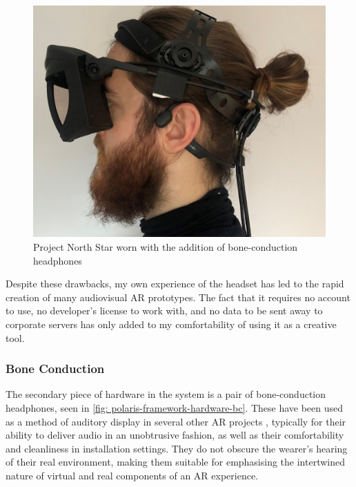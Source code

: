 \begin{figure}
    \vspace{-\intextsep}
    \hfill
    \begin{minipage}{0.95\linewidth}
            \includegraphics[width=\linewidth]{figures/06-polaris/polaris-framework-hardware-bc.jpg}
            \captionsetup{justification=justified}
            \caption{Project North Star worn with the addition of bone-conduction headphones}\label{fig: polaris-framework-hardware-bc}
    \end{minipage}
\end{figure}
Despite these drawbacks, my own experience of the headset has led to the rapid creation of many audiovisual AR prototypes. The fact that it requires no account to use, no developer's license to work with, and no data to be sent away to corporate servers has only added to my comfortability of using it as a creative tool.

\subsubsection{Bone Conduction}\label{sec: polaris-framework-hardware-bc}
The secondary piece of hardware in the system is a pair of bone-conduction headphones, seen in \autoref{fig: polaris-framework-hardware-bc}. These have been used as a method of auditory display in several other AR projects \citep{lindeman2008,barde2016,chevalier2018}, typically for their ability to deliver audio in an unobtrusive fashion, as well as their comfortability and cleanliness in installation settings. They do not obscure the wearer's hearing of their real environment, making them suitable for emphasising the intertwined nature of virtual and real components of an AR experience.


